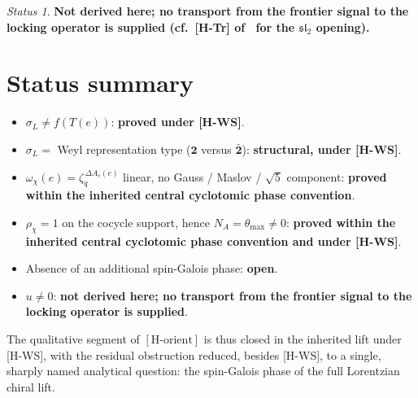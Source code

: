 \documentclass[11pt]{article}
\theoremstyle{plain}
\theoremstyle{remark}
\newtheorem*{status}{Status}
\newcommand{\zq}{\zeta_q}
\newcommand{\dac}{\Delta A_c}
\newcommand{\rhochi}{\rho_\chi}
\newcommand{\thmax}{\theta_{\max}}
\newcommand{\NA}{N_A}
\newcommand{\two}{\mathbf{2}}
\newcommand{\twobar}{\bar{\mathbf{2}}}
\newcommand{\Horient}{[\mathrm{H\text{-}orient}]}
\begin{document}
    \begin{status}\textbf{Not derived here; no transport from the frontier signal to the locking operator is supplied
      (cf.\ [H-Tr] of~\cite{Beau2026prs} for the $\mathfrak{sl}_2$ opening).}\end{status}

  \section{Status summary}

    \begin{itemize}
      \item $\sigma_L \neq f(T(e))$: \textbf{proved under [H-WS]}.
      \item $\sigma_L = $ Weyl representation type ($\two$ versus $\twobar$): \textbf{structural, under [H-WS]}.
      \item $\omega_\chi(e) = \zq^{\,\dac(e)}$ linear, no Gauss / Maslov / $\sqrt{5}$ component:
      \textbf{proved within the inherited central cyclotomic phase convention}.
      \item $\rhochi = 1$ on the cocycle support, hence $\NA = \thmax \neq 0$:
      \textbf{proved within the inherited central cyclotomic phase convention and under [H-WS]}.
      \item Absence of an additional spin-Galois phase: \textbf{open}.
      \item $u \neq 0$: \textbf{not derived here; no transport from the frontier signal to the locking operator is supplied}.
    \end{itemize}

    The qualitative segment of $\Horient$ is thus closed in the inherited lift under [H-WS], with the residual obstruction
    reduced, besides [H-WS], to a single, sharply named analytical question: the spin-Galois phase of the full Lorentzian
    chiral lift.

    \newpage
    
    
\end{document}
